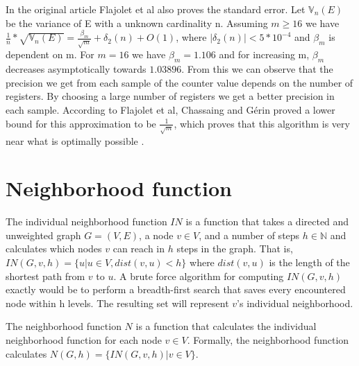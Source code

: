 In the original article Flajolet et al also proves the standard error. Let $\mathbb{V}_n(E)$ be the variance of E with a unknown cardinality n. Assuming $m \geq 16$ we have $\frac{1}{n}*\sqrt{\mathbb{V}_n(E)} = \frac{\beta_m}{\sqrt{m}}  + \delta_2(n) + O(1)$, where $|\delta_2(n)| < 5*10^{-4}$ and $\beta_m$ is dependent on m. For $m = 16$ we have $\beta_m = 1.106$ and for increasing m, $\beta_m$ decreases asymptotically towards $1.03896$. From this we can observe that the precision we get from each sample of the counter value depends on the number of registers. By choosing a large number of registers we get a better precision in each sample. According to Flajolet et al, Chassaing and Gérin proved a lower bound for this approximation to be $\frac{1}{\sqrt{m}}$, which proves that this algorithm is very near what is optimally possible \cite{nearopt}.

\section{Neighborhood function}
The individual neighborhood function $IN$ is a function that takes a directed and unweighted graph $G = (V,E)$, a node $v \in V$, and a number of steps $h \in \mathbb{N}$ and calculates which nodes $v$ can reach in $h$ steps in the graph. That is, $IN(G,v,h) = \{u | u \in V, dist(v,u) < h\}$ where $dist(v,u)$ is the length of the shortest path from $v$ to $u$. A brute force algorithm for computing $IN(G,v,h)$ exactly would be to perform a breadth-first search that saves every encountered node within h levels. The resulting set will represent $v$'s individual neighborhood.

The neighborhood function $N$ is a function that calculates the individual neighborhood function for each node $v \in V$. Formally, the neighborhood function calculates $N(G,h) = \{ IN(G,v,h) | v \in V \}$.


